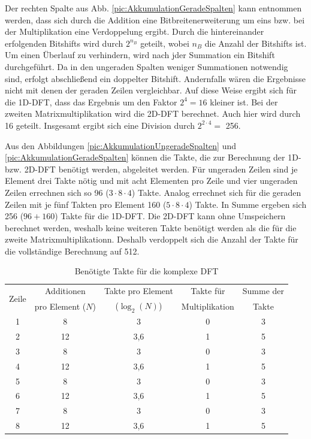 Der rechten Spalte aus Abb. \ref{pic:AkkumulationGeradeSpalten} kann entnommen werden, dass sich durch die Addition eine Bitbreitenerweiterung um eins bzw. bei der Multiplikation eine Verdoppelung ergibt. 
Durch die hintereinander erfolgenden Bitshifts wird durch $2^{n_B}$ geteilt, 
wobei $n_B$ die Anzahl der Bitshifts ist.
Um einen Überlauf zu verhindern, wird nach jder Summation ein Bitshift durchgeführt.
Da in den ungeraden Spalten weniger Summationen notwendig sind, erfolgt abschließend ein doppelter Bitshift.
Andernfalls wären die Ergebnisse nicht mit denen der geraden Zeilen vergleichbar.
Auf diese Weise ergibt sich für die
1D-DFT, dass das Ergebnis um den Faktor $2^4=16$ kleiner ist. 
Bei der zweiten Matrixmultiplikation wird die 2D-DFT berechnet. Auch hier wird durch 16 geteilt. Insgesamt ergibt sich
eine Division durch $2^{2\cdot4} = $ 256.

Aus den Abbildungen \ref{pic:AkkumulationUngeradeSpalten} und \ref{pic:AkkumulationGeradeSpalten} können die Takte, die zur Berechnung der 1D- bzw. 2D-DFT benötigt werden, 
abgeleitet werden.
Für ungeraden Zeilen sind je Element drei Takte nötig und mit acht Elementen pro Zeile und vier ungeraden Zeilen errechnen sich so 96 ($3\cdot8\cdot4$) Takte.
Analog errechnet sich für die geraden Zeilen mit je fünf Takten pro Element 160 ($5\cdot8\cdot4$) Takte.
In Summe ergeben sich 256 ($96+160$) Takte für die 1D-DFT. Die 2D-DFT kann ohne Umspeichern berechnet werden, 
weshalb keine weiteren Takte benötigt werden als die für die zweite Matrixmultiplikationn.
Deshalb verdoppelt sich die Anzahl der Takte für die vollständige Berechnung auf 512.

\begin{table}[ht!]
\centering
\caption{Benötigte Takte für die komplexe DFT}
\label{tab:TakteKomplexeDFT}
\begin{tabular}{ccccc}
\hline
\multirow{2}{*}{Zeile} & Additionen & Takte pro Element & Takte für & Summe der\\
      & pro Element ($N$) & ($\log_2(N)$) & Multiplikation & Takte\\
\hline
 1& 8  & 3   &0 &3\\
 2& 12 & 3,6 &1 &5\\
 3& 8  & 3   &0 &3\\
 4& 12 & 3,6 &1 &5\\
 5& 8  & 3   &0 &3\\
 6& 12 & 3,6 &1 &5\\
 7& 8  & 3   &0 &3\\
 8& 12 & 3,6 &1 &5\\
\hline
\end{tabular}
\end{table}


